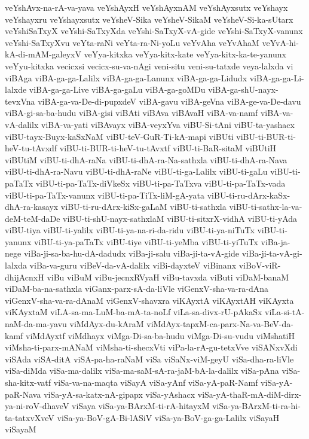 {veYshAvx-na-rA-va-yava
veYshAyxH
veYshAyxnAM
veYshAyxsutx
veYshayx
veYshayxru
veYshayxsutx
veYsheV-Sika
veYsheV-SikaM
veYsheV-Si-ka-sUtarx
veYshiSaTxyX
veYshi-SaTxyXda
veYshi-SaTxyX-vA-gide
veYshi-SaTxyX-vanunx
veYshi-SaTxyXvu
veYta-raNi
veYta-ra-Ni-yoLu
veYvAha
veYvAhaM
veYvA-hi-kA-di-mAM-galeyxV
veYya-kitxka
veYya-kitx-kate
veYya-kitx-ka-te-yanunx
veYyu-kitxka
vecicxsi
vecicx-su-va-nAgi
veni-situ
veni-su-tatxde
veya-lalxda
vi
viBAga
viBA-ga-ga-Lalilx
viBA-ga-ga-Lanunx
viBA-ga-ga-Lidudx
viBA-ga-ga-Li-lalxde
viBA-ga-ga-Live
viBA-ga-gaLu
viBA-ga-goMDu
viBA-ga-shU-nayx-tevxVna
viBA-ga-va-De-di-pupxdeV
viBA-gavu
viBA-geVna
viBA-ge-va-De-davu
viBA-gi-sa-ba-hudu
viBA-gisi
viBAti
viBAva
viBAvaH
viBA-va-namf
viBA-va-vA-dalilx
viBA-va-yati
viBAvayx
viBA-veyxYva
viBU-Si-tAni
viBU-ta-yashacx
viBU-tayx-Buyx-kaSxNaM
viBU-teV-GuR-Ti-kA-mapi
viBUti
viBU-ti-BUR-ti-heV-tu-tAvxdf
viBU-ti-BUR-ti-heV-tu-tAvxtf
viBU-ti-BaR-sitaM
viBUtiH
viBUtiM
viBU-ti-dhA-raNa
viBU-ti-dhA-ra-Na-sathxla
viBU-ti-dhA-ra-Nava
viBU-ti-dhA-ra-Navu
viBU-ti-dhA-raNe
viBU-ti-ga-Lalilx
viBU-ti-gaLu
viBU-ti-paTaTx
viBU-ti-pa-TaTx-diVkeSx
viBU-ti-pa-TaTxva
viBU-ti-pa-TaTx-vada
viBU-ti-pa-TaTx-vanunx
viBU-ti-pa-TiTx-liM-gA-yata
viBU-ti-ru-dArx-kaSx-dhA-ra-kasayx
viBU-ti-ru-dArx-kiSx-gaLaM
viBU-ti-sathxla
viBU-ti-sathx-la-va-deM-teM-daDe
viBU-ti-shU-nayx-sathxlaM
viBU-ti-sitxrX-vidhA
viBU-ti-yAda
viBU-tiya
viBU-ti-yalilx
viBU-ti-ya-na-ri-da-ridu
viBU-ti-ya-niTuTx
viBU-ti-yanunx
viBU-ti-ya-paTaTx
viBU-tiye
viBU-ti-yeMba
viBU-ti-yiTuTx
viBa-ja-nege
viBa-ji-sa-ba-hu-dA-dadudx
viBa-ji-salu
viBa-ji-ta-vA-gide
viBa-ji-ta-vA-gi-lalxda
viBa-va-guru
viBeV-da-vA-dalilx
viBi-dayxteV
viBinanx
viBoV-viR-dhijAcnxH
viBu
viBuM
viBu-jecnxRVyaH
viBu-tavxda
viButi
viDaM-banaM
viDaM-ba-na-sathxla
viGanx-parx-sA-da-liVle
viGenxV-sha-va-ra-dAna
viGenxV-sha-va-ra-dAnaM
viGenxV-shavxra
viKAyxtA
viKAyxtAH
viKAyxta
viKAyxtaM
viLA-sa-ma-LuM-ba-mA-ta-noLf
viLa-sa-divx-rU-pAkaSx
viLa-si-tA-naM-da-ma-yavu
viMdAyx-du-kAraM
viMdAyx-tapxM-ca-parx-Na-va-BeV-da-kamf
viMdAyxtf
viMdhayx
viMga-Di-sa-ba-hudu
viMga-Di-su-vudu
viMshatiH
viMsha-ti-parx-mANaM
viMsha-ti-shecxVti
viPa-la-rA-gu-tetxVve
viSANxvXdi
viSAda
viSA-ditA
viSA-pa-ha-raNaM
viSa
viSaNx-viM-geyU
viSa-dha-ra-liVle
viSa-diMda
viSa-ma-dalilx
viSa-ma-saM-sA-ra-jaM-bA-la-dalilx
viSa-pAna
viSa-sha-kitx-vatf
viSa-va-na-maqta
viSayA
viSa-yAnf
viSa-yA-paR-Namf
viSa-yA-paR-Nava
viSa-yA-sa-katx-nA-gipapx
viSa-yAshacx
viSa-yA-thaR-mA-diM-dirx-ya-ni-roV-dhaveV
viSaya
viSa-ya-BArxM-ti-rA-hitayxM
viSa-ya-BArxM-ti-ra-hi-ta-tatxvXveV
viSa-ya-BoV-gA-Bi-lASiV
viSa-ya-BoV-ga-ga-Lalilx
viSayaH
viSayaM
}
